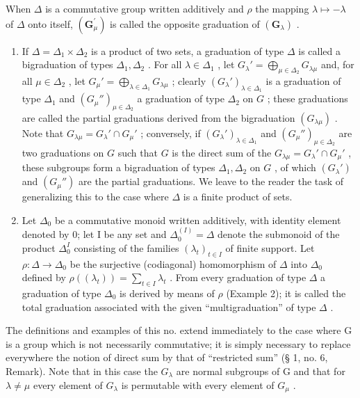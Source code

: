 When \(\Delta\) is a commutative group written additively and \(\rho\) the mapping \(\lambda \mapsto -\lambda\) of \(\Delta\) onto itself, \((\mathbf{G}_{\mu}^{\prime})\) is called the opposite graduation of \((\mathbf{G}_{\lambda})\) .

\begin{enumerate}
\def\labelenumi{(\arabic{enumi})}
\setcounter{enumi}{2}
\item
  If \(\Delta = \Delta_1 \times \Delta_2\) is a product of two sets, a graduation of type \(\Delta\) is called a bigraduation of types \(\Delta_1, \Delta_2\) . For all \(\lambda \in \Delta_1\) , let \(G_{\lambda}' = \bigoplus_{\mu \in \Delta_2} G_{\lambda\mu}\) and, for all \(\mu \in \Delta_2\) , let \(G_{\mu}' = \bigoplus_{\lambda \in \Delta_1} G_{\lambda\mu}\) ; clearly \((G_{\lambda}')_{\lambda \in \Delta_1}\) is a graduation of type \(\Delta_1\) and \((G_{\mu}'')_{\mu \in \Delta_2}\) a graduation of type \(\Delta_2\) on \(G\) ; these graduations are called the partial graduations derived from the bigraduation \((G_{\lambda\mu})\) . Note that \(G_{\lambda\mu} = G_{\lambda}' \cap G_{\mu}'\) ; conversely, if \((G_{\lambda}')_{\lambda \in \Delta_1}\) and \((G_{\mu}'')_{\mu \in \Delta_2}\) are two graduations on \(G\) such that \(G\) is the direct sum of the \(G_{\lambda\mu} = G_{\lambda}' \cap G_{\mu}'\) , these subgroups form a bigraduation of types \(\Delta_1, \Delta_2\) on \(G\) , of which \((G_{\lambda}')\) and \((G_{\mu}'')\) are the partial graduations. We leave to the reader the task of generalizing this to the case where \(\Delta\) is a finite product of sets.
\item
  Let \(\Delta_0\) be a commutative monoid written additively, with identity element denoted by 0; let I be any set and \(\Delta_0^{(I)} = \Delta\) denote the submonoid of the product \(\Delta_0^I\) consisting of the families \((\lambda_t)_{t \in I}\) of finite support. Let \(\rho: \Delta \to \Delta_0\) be the surjective (codiagonal) homomorphism of \(\Delta\) into \(\Delta_0\) defined by \(\rho((\lambda_t)) = \sum_{t \in I} \lambda_t\) . From every graduation of type \(\Delta\) a graduation of type \(\Delta_0\) is derived by means of \(\rho\) (Example 2); it is called the total graduation associated with the given ``multigraduation'' of type \(\Delta\) .
\end{enumerate}

The definitions and examples of this no. extend immediately to the case where G is a group which is not necessarily commutative; it is simply necessary to replace everywhere the notion of direct sum by that of ``restricted sum'' (§ 1, no. 6, Remark). Note that in this case the \(G_{\lambda}\) are normal subgroups of G and that for \(\lambda \neq \mu\) every element of \(G_{\lambda}\) is permutable with every element of \(G_{\mu}\) .

